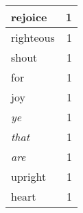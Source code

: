 \begin{center}
\begin{longtable}{l|r}
rejoice & 1 \\ \hline
righteous & 1 \\ \hline
shout & 1 \\ \hline
for & 1 \\ \hline
joy & 1 \\ \hline
\emph{ye} & 1 \\ \hline
\emph{that} & 1 \\ \hline
\emph{are} & 1 \\ \hline
upright & 1 \\ \hline
heart & 1 \\ \hline
\end{longtable}
\end{center}



\normalsize



